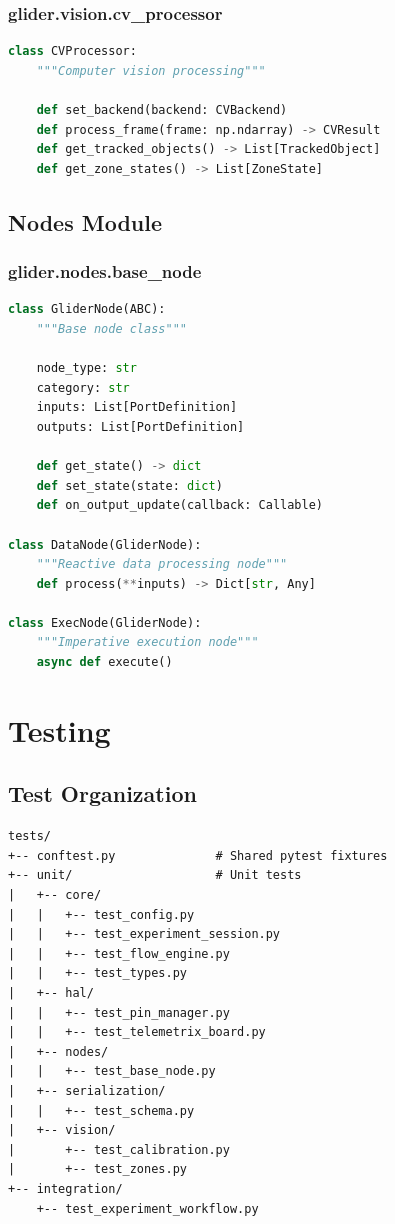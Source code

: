 \documentclass[11pt,a4paper]{article}
\begin{document}
\subsubsection{glider.vision.cv\_processor}

\begin{lstlisting}[language=Python]
class CVProcessor:
    """Computer vision processing"""

    def set_backend(backend: CVBackend)
    def process_frame(frame: np.ndarray) -> CVResult
    def get_tracked_objects() -> List[TrackedObject]
    def get_zone_states() -> List[ZoneState]
\end{lstlisting}

\subsection{Nodes Module}

\subsubsection{glider.nodes.base\_node}

\begin{lstlisting}[language=Python]
class GliderNode(ABC):
    """Base node class"""

    node_type: str
    category: str
    inputs: List[PortDefinition]
    outputs: List[PortDefinition]

    def get_state() -> dict
    def set_state(state: dict)
    def on_output_update(callback: Callable)

class DataNode(GliderNode):
    """Reactive data processing node"""
    def process(**inputs) -> Dict[str, Any]

class ExecNode(GliderNode):
    """Imperative execution node"""
    async def execute()
\end{lstlisting}

\section{Testing}

\subsection{Test Organization}

\begin{verbatim}
tests/
+-- conftest.py              # Shared pytest fixtures
+-- unit/                    # Unit tests
|   +-- core/
|   |   +-- test_config.py
|   |   +-- test_experiment_session.py
|   |   +-- test_flow_engine.py
|   |   +-- test_types.py
|   +-- hal/
|   |   +-- test_pin_manager.py
|   |   +-- test_telemetrix_board.py
|   +-- nodes/
|   |   +-- test_base_node.py
|   +-- serialization/
|   |   +-- test_schema.py
|   +-- vision/
|       +-- test_calibration.py
|       +-- test_zones.py
+-- integration/
    +-- test_experiment_workflow.py
\end{verbatim}
\end{document}
